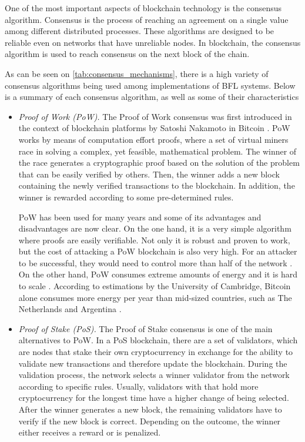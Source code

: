 One of the most important aspects of blockchain technology is the consensus algorithm. Consensus is the process of reaching an agreement on a single value among different distributed processes. These algorithms are designed to be reliable even on networks that have unreliable nodes. In blockchain, the consensus algorithm is used to reach consensus on the next block of the chain.



As can be seen on \autoref{tab:consensus_mechanisms}, there is a high variety of consensus algorithms being used among implementations of BFL systems. Below is a summary of each consensus algorithm, as well as some of their characteristics

\begin{itemize}
    \item \textit{Proof of Work (PoW).} The Proof of Work consensus was first introduced in the context of blockchain platforms by Satoshi Nakamoto in Bitcoin \cite{nakamoto2009bitcoin}. PoW works by means of computation effort proofs, where a set of virtual miners race in solving a complex, yet feasible, mathematical problem. The winner of the race generates a cryptographic proof based on the solution of the problem that can be easily verified by others. Then, the winner adds a new block containing the newly verified transactions to the blockchain. In addition, the winner is rewarded according to some pre-determined rules.
    
    PoW has been used for many years and some of its advantages and disadvantages are now clear. On the one hand, it is a very simple algorithm where proofs are easily verifiable. Not only it is robust and proven to work, but the cost of attacking a PoW blockchain is also very high. For an attacker to be successful, they would need to control more than half of the network \cite{li_blockchain_2021}. On the other hand, PoW consumes extreme amounts of energy and it is hard to scale \cite{edwood_2020, li_blockchain_2021}. According to estimations by the University of Cambridge, Bitcoin alone consumes more energy per year than mid-sized countries, such as The Netherlands and Argentina \cite{ccaf}.
    
    \item \textit{Proof of Stake (PoS).} The Proof of Stake consensus is one of the main alternatives to PoW. In a PoS blockchain, there are a set of validators, which are nodes that stake their own cryptocurrency in exchange for the ability to validate new transactions and therefore update the blockchain. During the validation process, the network selects a winner validator from the network according to specific rules. Usually, validators with that hold more cryptocurrency for the longest time have a higher change of being selected. After the winner generates a new block, the remaining validators have to verify if the new block is correct. Depending on the outcome, the winner either receives a reward or is penalized.
    

\end{itemize}
